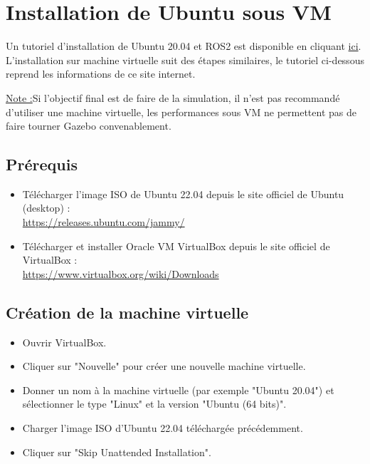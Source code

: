 \chapter{Installation de Ubuntu sous VM}

Un tutoriel d'installation de Ubuntu 20.04 et ROS2 est disponible en cliquant  
\href{https://insa-strasbourg-urrmc.readthedocs.io/fr/latest/index.html}{ici}.  
L'installation sur machine virtuelle suit des étapes similaires, le tutoriel ci-dessous reprend les informations de ce site internet.

\underline{Note :}Si l'objectif final est de faire de la simulation, il n'est pas recommandé d'utiliser une machine virtuelle, les performances sous VM ne permettent pas de faire tourner Gazebo convenablement.

\section{Prérequis}

\begin{itemize}
    \item Télécharger l'image ISO de Ubuntu 22.04 depuis le site officiel de Ubuntu (desktop) :  \\
    \href{https://releases.ubuntu.com/jammy/}{\url{https://releases.ubuntu.com/jammy/}}
    \item Télécharger et installer Oracle VM VirtualBox depuis le site officiel de VirtualBox :  \\
    \href{https://www.virtualbox.org/wiki/Downloads}{\url{https://www.virtualbox.org/wiki/Downloads}}
\end{itemize}

\section{Création de la machine virtuelle}

\begin{itemize}
    \item Ouvrir VirtualBox.
    \item Cliquer sur "Nouvelle" pour créer une nouvelle machine virtuelle.
    \item Donner un nom à la machine virtuelle (par exemple "Ubuntu 20.04") et sélectionner le type "Linux" et la version "Ubuntu (64 bits)".
    \item Charger l'image ISO d'Ubuntu 22.04 téléchargée précédemment.
    \item Cliquer sur "Skip Unattended Installation".
\end{itemize}

